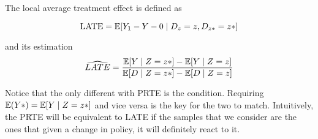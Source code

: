 The local average treatment effect is defined as

\begin{equation*}
    \operatorname{LATE} = \operatorname{\mathbb{E}}[Y_1 - Y-0 \mid D_z = z, D_{z*} = z*]
\end{equation*}

and its estimation
\begin{equation*}
    \widehat{LATE} = \frac
    {\operatorname{\mathbb{E}}[Y \mid Z=z*] - \operatorname{\mathbb{E}}[Y \mid Z=z]}
    {\operatorname{\mathbb{E}}[D \mid Z=z*] - \operatorname{\mathbb{E}}[D \mid Z=z]}
\end{equation*}

Notice that the only different with PRTE is the condition. 
Requiring $\operatorname{\mathbb{E}}(Y*) = \operatorname{\mathbb{E}}[Y \mid Z=z*]$ and vice versa is the key for the two to match.
Intuitively, the PRTE will be equivalent to LATE if the samples that we consider 
are the ones that given a change in policy, it will definitely react to it. 